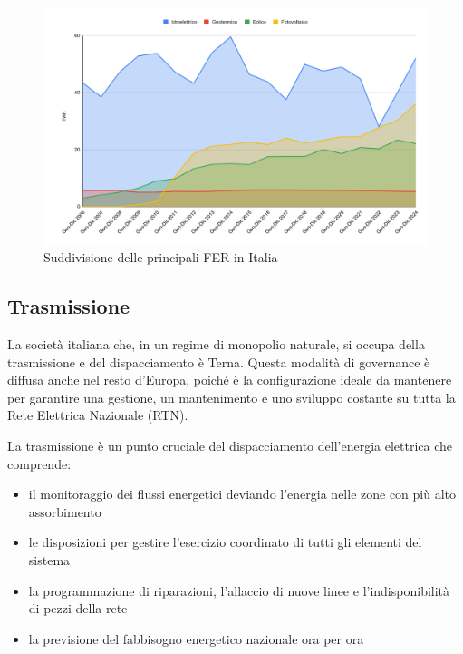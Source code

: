 \begin{figure}[h!]
    \centering
    \includegraphics[trim= 1.6cm 1cm 0.85cm 1.05cm, clip, width=1\linewidth]{img/Terna-FER-a-confronto-2006-2024.pdf}
    \caption{Suddivisione delle principali FER in Italia \cite{terna-rapporto-mensile-sito}}
    \label{graph:Terna-FER-a-confronto-2006-2024}
\end{figure}


\subsection{Trasmissione}
La società italiana che, in un regime di monopolio naturale, si occupa della trasmissione e del dispacciamento è Terna. Questa modalità di governance è diffusa anche nel resto d'Europa, poiché è la configurazione ideale da mantenere per garantire una gestione, un mantenimento e uno sviluppo costante su tutta la Rete Elettrica Nazionale (RTN).

La trasmissione è un punto cruciale del dispacciamento dell'energia elettrica che comprende: 

\begin{itemize}
    \item il monitoraggio dei flussi energetici deviando l'energia nelle zone con più alto assorbimento
    \item le disposizioni per gestire l'esercizio coordinato di tutti gli elementi del sistema 
    \item la programmazione di riparazioni, l'allaccio di nuove linee e l'indisponibilità di pezzi della rete
    \item la previsione del fabbisogno energetico nazionale ora per ora
\end{itemize}

